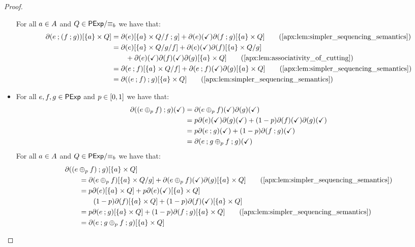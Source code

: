 \begin{proof}
\begin{itemize}
        For all $a \in {A}$ and $Q \in {\mathsf{PExp}}/{\equiv_b}$ we have that:
        \begin{align*}
            \partial(e \seq (f \seq g))[\{a\} \times Q] &= \partial(e)[\{a\} \times {Q}/{f \seq g}] + \partial(e)(\checkmark)\partial(f \seq g)[\{a\} \times Q] \tag{\Cref{apx:lem:simpler_sequencing_semantics}} \\
            &= \partial(e)[\{a\} \times {{Q}/{g}}/{f}] + \partial(e)(\checkmark)\partial(f)[\{a\} \times Q/{g}]\\
            &\quad\quad+\partial(e)(\checkmark)\partial(f)(\checkmark)\partial(g)[\{a\} \times Q] \tag{\Cref{apx:lem:associativity_of_cutting}}\\
            &=\partial(e \seq f)[\{a\} \times {Q}/{f}] + \partial(e \seq f)(\checkmark)\partial(g)[\{a\} \times Q] \tag{\Cref{apx:lem:simpler_sequencing_semantics}} \\
            &=\partial((e \seq f) \seq g)[\{a\} \times Q] \tag{\Cref{apx:lem:simpler_sequencing_semantics}}
        \end{align*}

        \item[] 
        For all $e,f,g \in \mathsf{PExp}$ and $p \in \interval{0}{1}$ we have that:
        \begin{align*}
            \partial((e \oplus_p f) \mathbin{;} g)(\checkmark) &= \partial(e \oplus_p f)(\checkmark)\partial(g)(\checkmark)\\
            &=p \partial(e)(\checkmark)\partial(g)(\checkmark) + (1-p)\partial(f)(\checkmark)\partial(g)(\checkmark)\\
            &= p \partial(e \mathbin{;} g)(\checkmark) + (1-p)\partial(f \mathbin{;} g)(\checkmark)\\
            &= \partial(e \mathbin{;} g \oplus_p f \mathbin{;} g)(\checkmark)
        \end{align*}
        For all $a \in {A}$ and $Q \in {\mathsf{PExp}}/{\equiv_b}$ we have that:
        \begin{align*}
            &\partial((e \oplus_p f) \seq g )[\{a\} \times Q]\\ &\quad\quad= \partial(e \oplus_p f)[\{a\} \times {Q}/{g}] + \partial(e \oplus_p f)(\checkmark)\partial(g)[\{a\} \times Q] \tag{\Cref{apx:lem:simpler_sequencing_semantics}}\\
            &\quad\quad=p \partial(e)[\{a\} \times Q ] + p \partial(e)(\checkmark)[\{a\} \times Q]\\
            &\quad\quad\quad\quad (1-p) \partial(f)[\{a\} \times Q ] + (1-p) \partial(f)(\checkmark)[\{a\} \times Q] \\
            &\quad\quad=p \partial(e \seq g)[\{a\} \times Q] + (1-p)\partial(f \seq g)[\{a\} \times Q] \tag{\Cref{apx:lem:simpler_sequencing_semantics}}\\
            &\quad\quad=\partial(e \seq g \oplus_p f \seq g)[\{a\} \times Q]
        \end{align*}


\end{itemize}
\end{proof}
